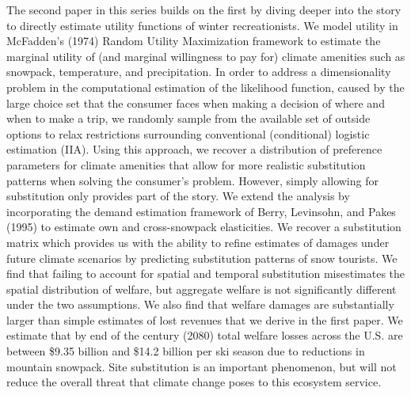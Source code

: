 \documentclass[12pt]{article}
\begin{document}
The second paper in this series builds on the first by diving deeper into the story to directly estimate utility functions of winter recreationists. We model utility in McFadden's (1974) Random Utility Maximization framework to estimate the marginal utility of (and marginal willingness to pay for) climate amenities such as snowpack, temperature, and precipitation. In order to address a dimensionality problem in the computational estimation of the likelihood function, caused by the large choice set that the consumer faces when making a decision of where and when to make a trip, we randomly sample from the available set of outside options to relax restrictions surrounding conventional (conditional) logistic estimation (IIA). Using this approach, we recover a distribution of preference parameters for climate amenities that allow for more realistic substitution patterns when solving the consumer's problem. However, simply allowing for substitution only provides part of the story. We extend the analysis by incorporating the demand estimation framework of Berry, Levinsohn, and Pakes (1995) to estimate own and cross-snowpack elasticities. We recover a substitution matrix which provides us with the ability to refine estimates of damages under future climate scenarios by predicting substitution patterns of snow tourists. We find that failing to account for spatial and temporal substitution misestimates the spatial distribution of welfare, but aggregate welfare is not significantly different under the two assumptions. We also find that welfare damages are substantially larger than simple estimates of lost revenues that we derive in the first paper. We estimate that by end of the century (2080) total welfare losses across the U.S. are between \$9.35 billion and \$14.2 billion per ski season due to reductions in mountain snowpack. Site substitution is an important phenomenon, but will not reduce the overall threat that climate change poses to this ecosystem service. 
\end{document}
